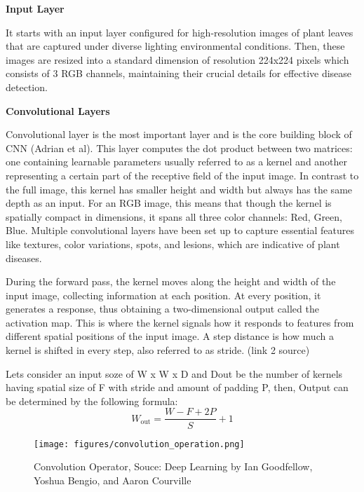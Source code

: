 \textbf{Input Layer} 

It starts with an input layer configured for high-resolution images of plant leaves that are captured under diverse lighting
environmental conditions. Then, these images are resized into a standard dimension of 
resolution 224x224 pixels which consists of 3 RGB channels, maintaining their crucial details for effective disease 
detection.

\textbf{Convolutional Layers}

Convolutional layer is the most important layer and is the core building block of CNN (Adrian et al). This layer computes the dot 
product between two matrices: one containing learnable parameters usually referred to as a kernel and another representing a certain 
part of the receptive field of the input image. In contrast to the full image, this kernel has smaller height and width but always 
has the same depth as an input. For an RGB image, this means that though the kernel is spatially compact in dimensions, it spans all 
three color channels: Red, Green, Blue. Multiple convolutional layers have been set up to capture essential features like textures, 
color variations, spots, and lesions, which are indicative of plant diseases.

During the forward pass, the kernel moves along the height and width of the input image, collecting information at each position. 
At every position, it generates a response, thus obtaining a two-dimensional output called the activation map. This is where the 
kernel signals how it responds to features from different spatial positions of the input image. A step distance is how much a kernel 
is shifted in every step, also referred to as stride. (link 2 source)

Lets consider an input soze of W x W x D and Dout be the number of kernels having spatial size of F with stride and amount of padding P,
then, Output can be determined by the following formula: 
\begin{equation}
    W_{\text{out}} = \frac{W - F + 2P}{S} + 1
\end{equation}


\clearpage  %

\begin{figure}[h]
    \centering
    \texttt{[image: figures/convolution\_operation.png]}
    \captionsetup{labelsep=colon, justification=centering, labelfont=bf}
    \caption{Convolution Operator, Souce: Deep Learning by Ian Goodfellow, Yoshua Bengio, and Aaron Courville }
\end{figure}

